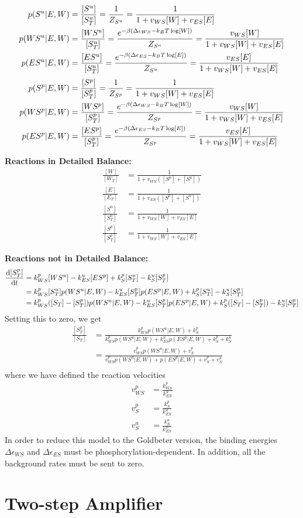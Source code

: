 \documentclass[aps,onecolumn,superscriptaddress,notitlepage]{revtex4-1}
\begin{document}
\begin{align}
p(S^u|E, W) &= \frac{[S^u]}{[S^u_T]} = \frac{1}{Z_{S^u}} = \frac{1}{1 + v_{WS}[W]+ v_{ES}[E]}\\
p(WS^u|E, W) &= \frac{[WS^u]}{[S^u_T]} = \frac{ e^{-\beta\qty(\Delta\epsilon_{WS} -k_BT \log[W])}}{Z_{S^u}} = \frac{v_{WS}[W]}{1 + v_{WS}[W]+ v_{ES}[E]}\\
p(ES^u|E, W) &= \frac{[ES^u]}{[S^u_T]} = \frac{ e^{-\beta\qty(\Delta\epsilon_{ES} -k_BT \log[E])}}{Z_{S^u}} = \frac{v_{ES}[E]}{1 + v_{WS}[W]+ v_{ES}[E]}
\end{align}
\begin{align}
p(S^p|E, W) &= \frac{[S^p]}{[S^p_T]} = \frac{1}{Z_{S^p}} = \frac{1}{1 + v_{WS}[W]+ v_{ES}[E]}\\
p(WS^p|E, W) &= \frac{[WS^p]}{[S^p_T]} = \frac{ e^{-\beta\qty(\Delta\epsilon_{WS} -k_BT \log[W])}}{Z_{S^p}} = \frac{v_{WS}[W]}{1 + v_{WS}[W]+ v_{ES}[E]}\\
p(ES^p|E, W) &= \frac{[ES^p]}{[S^p_T]} = \frac{ e^{-\beta\qty(\Delta\epsilon_{ES} -k_BT \log[E])}}{Z_{S^p}} = \frac{v_{ES}[E]}{1 + v_{WS}[W]+ v_{ES}[E]}
\end{align}

\textbf{Reactions in Detailed Balance:}
\begin{align}
\frac{[W]}{[W_T]} & = \frac{1}{1 + v_{WS}([S^p]+[S^u])}\\
\frac{[E]}{[E_T]} & = \frac{1}{1 + v_{ES}([S^p]+[S^u])}\\
\frac{[S^u]}{[S^u_T]} &= \frac{1}{1 + v_{WS}[W]+ v_{ES}[E]}\\
\frac{[S^p]}{[S^p_T]} &=  \frac{1}{1+ v_{WS}[W] + v_{ES}[E]}
\end{align}

\textbf{Reactions not in  Detailed Balance:}
\begin{align}
\dv{[S^p_T]}{t} &= k_{WS}^p[WS^u] - k_{ES}^u[ES^p] + k_S^p[S^u_T] - k_S^u[S^p_T] \\
&= k_{WS}^p[S^u_T]p(WS^u|E, W) - k_{ES}^u[S^p_T]p(ES^p|E, W) + k_S^p[S^u_T] - k_S^u[S^p_T]\\
&= k_{WS}^p([S_T]-[S^p_T])p(WS^u|E, W) - k_{ES}^u[S^p_T]p(ES^p|E, W) + k_S^p([S_T]-[S^p_T]) - k_S^u[S^p_T]
\end{align}
Setting this to zero, we get
\begin{align}
\frac{[S_T^p]}{[S_T]} &= \frac{k_{WS}^p p(WS^u|E,W) + k_S^p}{k_{WS}^p p(WS^u|E,W) + k_{ES}^u p(ES^p|E,W) + k_S^p + k_S^u}\\
 &= \frac{v_{WS}^p p(WS^u|E,W) + v_S^p}{v_{WS}^p p(WS^u|E,W) + p(ES^p|E,W) + v_S^p + v_S^u}\\
\end{align}
where we have defined the reaction velocities
\begin{align}
v_{WS}^p &= \frac{k_{WS}^p}{k_{ES}^u}\\
v_S^p &= \frac{k_S^p}{k_{ES}^u}\\
v_S^u &= \frac{k_S^u}{k_{ES}^u}
\end{align}
In order to reduce this model to the Goldbeter version, the binding energies $\Delta \epsilon_{WS}$ and $\Delta \epsilon_{ES}$ must be phosphorylation-dependent. In addition, all the background rates must be sent to zero.

\section{Two-step Amplifier}



\end{document}
